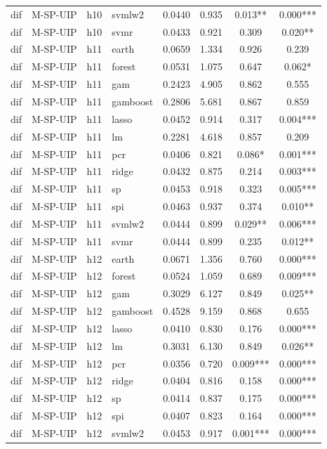 \begin{ThreePartTable}
\begin{longtable}[t]{llclcccc}
dif & M-SP-UIP & h10 & svmlw2 & 0.0440 & 0.935 & 0.013** & 0.000***\\
dif & M-SP-UIP & h10 & svmr & 0.0433 & 0.921 & 0.309 & 0.020**\\
\addlinespace
dif & M-SP-UIP & h11 & earth & 0.0659 & 1.334 & 0.926 & 0.239\\
dif & M-SP-UIP & h11 & forest & 0.0531 & 1.075 & 0.647 & 0.062*\\
dif & M-SP-UIP & h11 & gam & 0.2423 & 4.905 & 0.862 & 0.555\\
dif & M-SP-UIP & h11 & gamboost & 0.2806 & 5.681 & 0.867 & 0.859\\
dif & M-SP-UIP & h11 & lasso & 0.0452 & 0.914 & 0.317 & 0.004***\\
dif & M-SP-UIP & h11 & lm & 0.2281 & 4.618 & 0.857 & 0.209\\
dif & M-SP-UIP & h11 & pcr & 0.0406 & 0.821 & 0.086* & 0.001***\\
dif & M-SP-UIP & h11 & ridge & 0.0432 & 0.875 & 0.214 & 0.003***\\
dif & M-SP-UIP & h11 & sp & 0.0453 & 0.918 & 0.323 & 0.005***\\
dif & M-SP-UIP & h11 & spi & 0.0463 & 0.937 & 0.374 & 0.010**\\
dif & M-SP-UIP & h11 & svmlw2 & 0.0444 & 0.899 & 0.029** & 0.006***\\
dif & M-SP-UIP & h11 & svmr & 0.0444 & 0.899 & 0.235 & 0.012**\\
\addlinespace
dif & M-SP-UIP & h12 & earth & 0.0671 & 1.356 & 0.760 & 0.000***\\
dif & M-SP-UIP & h12 & forest & 0.0524 & 1.059 & 0.689 & 0.009***\\
dif & M-SP-UIP & h12 & gam & 0.3029 & 6.127 & 0.849 & 0.025**\\
dif & M-SP-UIP & h12 & gamboost & 0.4528 & 9.159 & 0.868 & 0.655\\
dif & M-SP-UIP & h12 & lasso & 0.0410 & 0.830 & 0.176 & 0.000***\\
dif & M-SP-UIP & h12 & lm & 0.3031 & 6.130 & 0.849 & 0.026**\\
dif & M-SP-UIP & h12 & pcr & 0.0356 & 0.720 & 0.009*** & 0.000***\\
dif & M-SP-UIP & h12 & ridge & 0.0404 & 0.816 & 0.158 & 0.000***\\
dif & M-SP-UIP & h12 & sp & 0.0414 & 0.837 & 0.175 & 0.000***\\
dif & M-SP-UIP & h12 & spi & 0.0407 & 0.823 & 0.164 & 0.000***\\
dif & M-SP-UIP & h12 & svmlw2 & 0.0453 & 0.917 & 0.001*** & 0.000***\\

\end{longtable}
\end{ThreePartTable}
